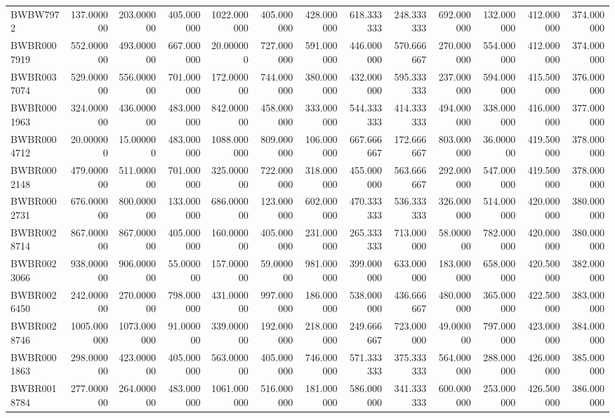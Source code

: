 \begin{longtable}{lrrrrrrrrrrrr}
BWBW7972 & 137.000000 & 203.000000 & 405.000000 & 1022.000000 & 405.000000 & 428.000000 & 618.333333 & 248.333333 & 692.000000 & 132.000000 & 412.000000 & 374.000000 \\
BWBR0007919 & 552.000000 & 493.000000 & 667.000000 & 20.000000 & 727.000000 & 591.000000 & 446.000000 & 570.666667 & 270.000000 & 554.000000 & 412.000000 & 374.000000 \\
BWBR0037074 & 529.000000 & 556.000000 & 701.000000 & 172.000000 & 744.000000 & 380.000000 & 432.000000 & 595.333333 & 237.000000 & 594.000000 & 415.500000 & 376.000000 \\
BWBR0001963 & 324.000000 & 436.000000 & 483.000000 & 842.000000 & 458.000000 & 333.000000 & 544.333333 & 414.333333 & 494.000000 & 338.000000 & 416.000000 & 377.000000 \\
BWBR0004712 & 20.000000 & 15.000000 & 483.000000 & 1088.000000 & 809.000000 & 106.000000 & 667.666667 & 172.666667 & 803.000000 & 36.000000 & 419.500000 & 378.000000 \\
BWBR0002148 & 479.000000 & 511.000000 & 701.000000 & 325.000000 & 722.000000 & 318.000000 & 455.000000 & 563.666667 & 292.000000 & 547.000000 & 419.500000 & 378.000000 \\
BWBR0002731 & 676.000000 & 800.000000 & 133.000000 & 686.000000 & 123.000000 & 602.000000 & 470.333333 & 536.333333 & 326.000000 & 514.000000 & 420.000000 & 380.000000 \\
BWBR0028714 & 867.000000 & 867.000000 & 405.000000 & 160.000000 & 405.000000 & 231.000000 & 265.333333 & 713.000000 & 58.000000 & 782.000000 & 420.000000 & 380.000000 \\
BWBR0023066 & 938.000000 & 906.000000 & 55.000000 & 157.000000 & 59.000000 & 981.000000 & 399.000000 & 633.000000 & 183.000000 & 658.000000 & 420.500000 & 382.000000 \\
BWBR0026450 & 242.000000 & 270.000000 & 798.000000 & 431.000000 & 997.000000 & 186.000000 & 538.000000 & 436.666667 & 480.000000 & 365.000000 & 422.500000 & 383.000000 \\
BWBR0028746 & 1005.000000 & 1073.000000 & 91.000000 & 339.000000 & 192.000000 & 218.000000 & 249.666667 & 723.000000 & 49.000000 & 797.000000 & 423.000000 & 384.000000 \\
BWBR0001863 & 298.000000 & 423.000000 & 405.000000 & 563.000000 & 405.000000 & 746.000000 & 571.333333 & 375.333333 & 564.000000 & 288.000000 & 426.000000 & 385.000000 \\
BWBR0018784 & 277.000000 & 264.000000 & 483.000000 & 1061.000000 & 516.000000 & 181.000000 & 586.000000 & 341.333333 & 600.000000 & 253.000000 & 426.500000 & 386.000000 \\

\end{longtable}
